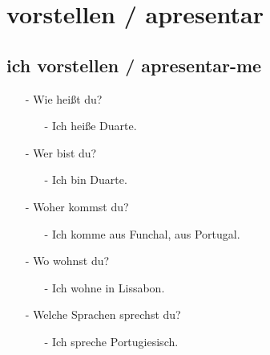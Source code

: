     \section{vorstellen / apresentar}\label{section:deutsch:vorstellen}

        \subsection{ich vorstellen / apresentar-me}\label{subsection:deutsch:ich_vorstellen}
            
            \begin{itemize}[topsep=0pt,itemsep=4pt,parsep=0pt]
                \item[-] Wie heißt du? 
                    \begin{itemize}
                        \item[-] Ich heiße Duarte. 
                    \end{itemize}
                \item[-] Wer bist du? 
                    \begin{itemize}
                        \item[-] Ich bin Duarte. 
                    \end{itemize}
                \item[-] Woher kommst du? 
                    \begin{itemize}
                        \item[-] Ich komme aus Funchal, aus Portugal. 
                    \end{itemize}
                \item[-] Wo wohnst du? 
                    \begin{itemize}
                        \item[-] Ich wohne in Lissabon. 
                    \end{itemize}
                \item[-] Welche Sprachen sprechst du? 
                    \begin{itemize}
                        \item[-] Ich spreche Portugiesisch. 
                    \end{itemize}
            \end{itemize}

